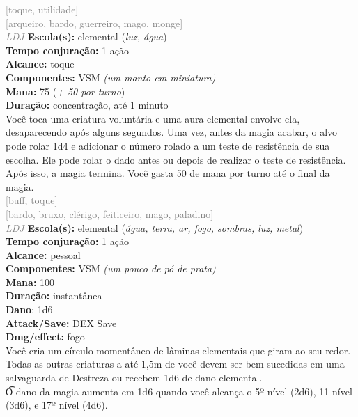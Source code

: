 \documentclass{RPG_Adventure}[2021/10/20]
\begin{document}
{\scriptsize \textcolor{gray}{[toque, utilidade]\\}}
{\scriptsize \textcolor{gray}{[arqueiro, bardo, guerreiro, mago, monge]\\}}
{\tiny \textcolor{gray}{\textit{LDJ}}}
{\small \t \textbf{Escola(s):} elemental (\textit{luz, água})\\\t \textbf{Tempo conjuração:} 1 ação\\\t \textbf{Alcance:} toque\\\t \textbf{Componentes:} VSM \textit{(um manto em miniatura)}\\\t \textbf{Mana:} 75 (\textit{+ 50 por turno})\\\t \textbf{Duração:} concentração, até 1 minuto\\}
{\normalsize Você toca uma criatura voluntária e uma aura elemental envolve ela, desaparecendo após alguns segundos. Uma vez, antes da magia acabar, o alvo pode rolar 1d4 e adicionar o número rolado a um teste de resistência de sua escolha. Ele pode rolar o dado antes ou depois de realizar o teste de resistência. Após isso, a magia termina. Você gasta 50 de mana por turno até o final da magia.\\}
{\scriptsize \textcolor{gray}{[buff, toque]\\}}
{\scriptsize \textcolor{gray}{[bardo, bruxo, clérigo, feiticeiro, mago, paladino]\\}}
{\tiny \textcolor{gray}{\textit{LDJ}}}
{\small \t \textbf{Escola(s):} elemental (\textit{água, terra, ar, fogo, sombras, luz, metal})\\\t \textbf{Tempo conjuração:} 1 ação\\\t \textbf{Alcance:} pessoal\\\t \textbf{Componentes:} VSM \textit{(um pouco de pó de prata)}\\\t \textbf{Mana:} 100\\\t \textbf{Duração:} instantânea\\\t \textbf{Dano}: 1d6\\\t \textbf{Attack/Save:} DEX Save\\\t \textbf{Dmg/effect:} fogo\\}
{\normalsize Você cria um círculo momentâneo de lâminas elementais que giram ao seu redor. Todas as outras criaturas a até 1,5m de você devem ser bem-sucedidas em uma salvaguarda de Destreza ou recebem 1d6 de dano elemental.\\\t O dano da magia aumenta em 1d6 quando você alcança o 5º nível (2d6), 11 nível (3d6), e 17º nível (4d6).\\}
\end{document}
